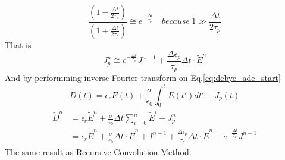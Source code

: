 \begin{equation}
  \frac{\left(1-\frac{\displaystyle\Delta t}{\displaystyle2\tau_p}\right)}{\left(1+\frac{\displaystyle\Delta t}{\displaystyle2\tau_p}\right)} \cong e^{-\frac{\Delta t}{\tau_p}}\quad  because\ 1 \gg \frac{\Delta t}{2\tau_p}
\end{equation}
That is 
\begin{equation}
  J_p^n \cong e^{-\frac{\Delta t}{\tau_p}}J^{n-1} + \frac{\Delta\epsilon_p}{\tau_p}\Delta t\cdot\widetilde{E}^n
\end{equation}
And by performming inverse Fourier transform on Eq.\ref{eq:debye_ade_start}
\begin{equation}
  \widetilde{D}(t) = \epsilon_r\widetilde{E}(t) + \frac{\sigma}{\epsilon_0} \int_0^t\widetilde{E}(t')dt' + J_p(t)
\end{equation}
\begin{equation}
  \begin{split}
    \widetilde{D}^n & = \epsilon_r\widetilde{E}^n + \frac{\sigma}{\epsilon_0}\Delta t\sum_{i=0}^n\widetilde{E}^i + J_p^n\\
    & = \epsilon_r\widetilde{E}^n + \frac{\sigma}{\epsilon_0}\Delta t\cdot\widetilde{E}^n + I^{n-1} + \frac{\Delta\epsilon_p}{\tau_p}\Delta t\cdot\widetilde{E}^n + e^{-\frac{\Delta t}{\tau_p}}J^{n-1}
  \end{split}
\end{equation}
The same result as Recursive Convolution Method.






